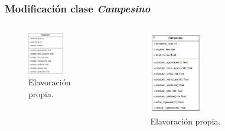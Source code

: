 \documentclass[17pt, t, lualatex]{beamer}
\begin{document}
\insertsectionpage

\begin{frame}
  \frametitle{Modificación clase \textit{Campesino}}


\begin{columns}
  \begin{column}{.5\textwidth}
  \begin{figure}[ht]
    \centering
    \includegraphics[width = 0.55\textwidth]{img/ClaseCampesino.png}
    \caption{Elavoración propia.}
  \end{figure}  
  \end{column}

  \begin{column}{.5\textwidth}
\begin{figure}[ht]
    \centering
    \includegraphics[width = 0.4\textwidth]{img/img2.png}
    \caption{Elavoración propia.}
  \end{figure}
  \end{column}
\end{columns}
    


\end{frame}
\end{document}
